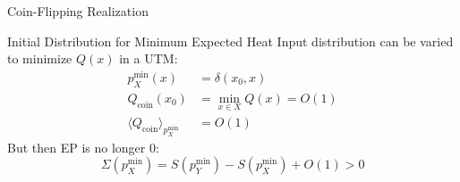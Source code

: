 \begin{frame}{Coin-Flipping Realization}
    \begin{block}{Initial Distribution for Minimum Expected Heat}
    Input distribution can be varied to minimize $Q(x)$ in a UTM:
    \begin{align*}
        p_X^\text{min} (x)&= \delta(x_0,x)\\
        Q_\text{coin}(x_0) &= \min_{x\in X} Q(x) = O(1)\\
        \langle Q_\text{coin}\rangle_{p_X^\text{min}} &= O(1)
    \end{align*}
    But then EP is no longer 0:
    \begin{equation*}
        \Sigma(p_X^\text{min}) = S(p_Y^\text{min}) - S(p_X^\text{min}) + O(1) > 0
    \end{equation*}
    \end{block}
\end{frame}
